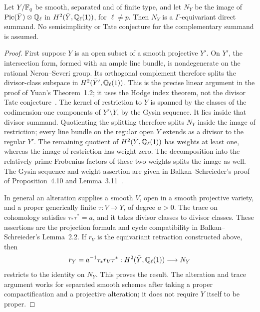 \begin{lemma}
\label{lem:B-divisor-splitting}
Let \(Y/\mathbb F_q\) be smooth, separated and of finite type, and let
\(N_Y\) be the image of \(\operatorname{Pic}(\bar Y)\otimes\mathbb Q_\ell\) in
\(H^2(\bar Y,\mathbb Q_\ell(1))\), for \(\ell\ne p\).  Then
\(N_Y\) is a \(\Gamma\)-equivariant direct summand.  No
semisimplicity or Tate conjecture for the complementary summand is
assumed.
\end{lemma}
\begin{proof}
First suppose \(Y\) is an open subset of a smooth projective
\(Y'\).  On \(Y'\), the intersection form, formed with an ample
line bundle, is nondegenerate on the rational Neron--Severi group.
Its orthogonal complement therefore splits the divisor-class
subspace in \(H^2(\bar Y',\mathbb Q_\ell(1))\).  This is the precise
linear argument in the proof of Yuan's Theorem~1.2; it uses the
Hodge index theorem, not the divisor Tate conjecture~\cite{BYuan2020}.
The kernel of restriction to \(Y\) is spanned by the classes of
the codimension-one components of \(Y'\setminus Y\), by the
Gysin sequence.  It lies inside that divisor summand.  Quotienting
the splitting therefore splits \(N_Y\) inside the image of
restriction; every line bundle on the regular open \(Y\) extends
as a divisor to the regular \(Y'\).  The remaining quotient of
\(H^2(\bar Y,\mathbb Q_\ell(1))\) has weights at least one, whereas
the image of restriction has weight zero.  The decomposition into
the relatively prime Frobenius factors of these two weights splits
the image as well.  The Gysin sequence and weight assertion are
given in Balkan--Schreieder's proof of Proposition~4.10 and
Lemma~3.11~\cite{BBalkanSchreieder2026}.

In general an alteration supplies a smooth \(V\), open in a
smooth projective variety, and a proper generically finite
\(\tau:V\to Y\), of degree \(a>0\).  The trace on cohomology
satisfies \(\tau_*\tau^*=a\), and it takes divisor classes to
divisor classes.  These assertions are the projection formula and
cycle compatibility in Balkan--Schreieder's Lemma~2.2.  If \(r_V\)
is the equivariant retraction constructed above, then
\[
 r_Y=a^{-1}\tau_*r_V\tau^*
 :H^2(\bar Y,\mathbb Q_\ell(1))\longrightarrow N_Y
\]
restricts to the identity on \(N_Y\).  This proves the result.
The alteration and trace argument works for separated smooth
schemes after taking a proper compactification and a projective
alteration; it does not require \(Y\) itself to be proper.
\end{proof}

